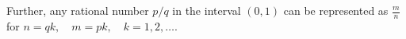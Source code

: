 \documentclass[preview]{standalone}
\begin{document}
\begin{center}
Further, any rational number $p/q$ in the interval $(0, 1)$ can be represented as $\frac{m}{n}$ for $n=qk, \quad m=pk, \quad k=1, 2, \dots$.
\end{center}
\end{document}
